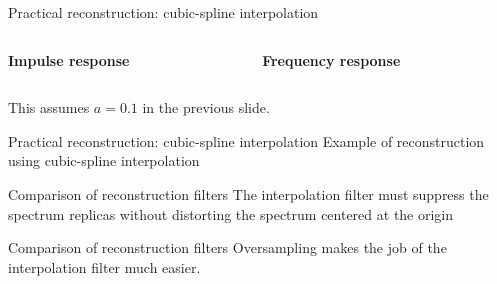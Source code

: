 \documentclass[10pt, aspectratio=169]{beamer}
\begin{document}
\begin{frame}{Practical reconstruction: cubic-spline interpolation}
	\begin{columns}[t]
		\begin{column}{0.5\textwidth}
			\textbf{Impulse response}
		\end{column}
		\begin{column}{0.5\textwidth}
			\textbf{Frequency response}
		\end{column}
	\end{columns}
	\begin{center}
		\resizebox{0.9\linewidth}{!}{}
	\end{center}
This assumes $a = 0.1$ in the previous slide.
\end{frame}

\begin{frame}{Practical reconstruction: cubic-spline interpolation}
	Example of reconstruction using cubic-spline interpolation
	\begin{center}
		\resizebox{0.7\linewidth}{!}{}
	\end{center}
\end{frame}

\begin{frame}{Comparison of reconstruction filters}
	The interpolation filter must suppress the spectrum replicas without distorting the spectrum centered at the origin 
	\begin{center}
		\resizebox{0.8\linewidth}{!}{}
	\end{center}	
\end{frame}

\begin{frame}{Comparison of reconstruction filters}
	Oversampling makes the job of the interpolation filter much easier. 
	\begin{center}
		\resizebox{0.8\linewidth}{!}{}
	\end{center}
\end{frame}
\end{document}

